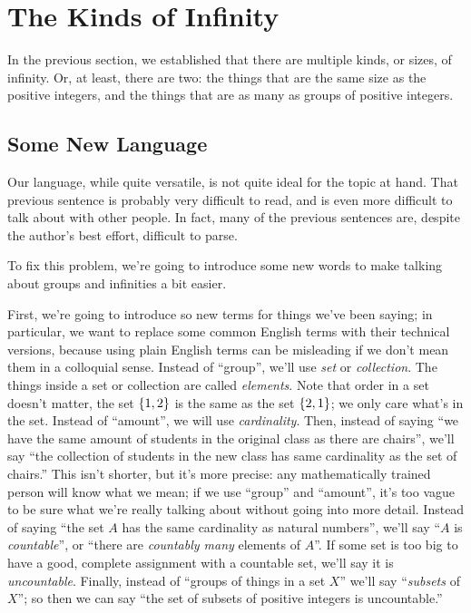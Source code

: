 \section{The Kinds of Infinity}

In the previous section, we established that there are multiple kinds, or sizes, of infinity.
Or, at least, there are two: the things that are the same size as the positive integers, and the things that are as many as groups of positive integers.

\subsection{Some New Language}

Our language, while quite versatile, is not quite ideal for the topic at hand.
That previous sentence is probably very difficult to read, and is even more difficult to talk about with other people.
In fact, many of the previous sentences are, despite the author's best effort, difficult to parse.

To fix this problem, we're going to introduce some new words to make talking about groups and infinities a bit easier.

First, we're going to introduce so new terms for things we've been saying; in particular, we want to replace some common English terms with their technical versions, because using plain English terms can be misleading if we don't mean them in a colloquial sense.
Instead of ``group'', we'll use \emph{set} or \emph{collection}.
The things inside a set or collection are called \emph{elements}.
Note that order in a set doesn't matter, the set ${\left\{ {1,2} \right\}}$ is the same as the set ${\left\{ {2,1} \right\}}$; we only care what's in the set.
Instead of ``amount'', we will use \emph{cardinality}.
Then, instead of saying ``we have the same amount of students in the original class as there are chairs'', we'll say ``the collection of students in the new class has same cardinality as the set of chairs.''
This isn't shorter, but it's more precise: any mathematically trained person will know what we mean; if we use ``group'' and ``amount'', it's too vague to be sure what we're really talking about without going into more detail.
Instead of saying ``the set $A$ has the same cardinality as natural numbers'', we'll say ``$A$ is \emph{countable}'', or ``there are \emph{countably many} elements of $A$''.
If some set is too big to have a good, complete assignment with a countable set, we'll say it is \emph{uncountable}.
Finally, instead of ``groups of things in a set $X$'' we'll say ``\emph{subsets} of $X$''; so then we can say ``the set of subsets of positive integers is uncountable.''

